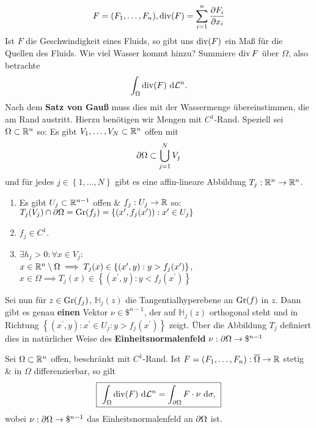 \[
	F = (F_1, \dotsc, F_n), \operatorname{div} (F) = \sum_{i=1}^{n} \frac{ \partial F_i }{ \partial x_i } 
\]
Ist $ F $ die Geschwindigkeit eines Fluids, so gibt uns $ \operatorname{div}(F) $ ein Maß für die Quellen des Fluids.
Wie viel Wasser kommt hinzu?
Summiere $ \operatorname{div} F $ über $ \Omega $, also betrachte 
\[
	\int_{\Omega}^{} \operatorname{div}(F) ~\text{d} \mathcal{L} ^n.
\]
Nach dem \textbf{Satz von Gauß} muss dies mit der Wassermenge übereinstimmen, die am Rand austritt.
Hierzu benötigen wir Mengen mit $ C^1 $-Rand.
Speziell sei $ \Omega \subset \mathbb{R} ^n $ so:
Es gibt $ V_1, \dotsc, V_N \subset \mathbb{R} ^n $ offen mit
\[
	\partial \Omega \subset \bigcup_{j = 1} ^{N} V_j
\]
und für jedes $ j \in \left\{ 1, \dotsc, N \right\}  $ gibt es eine affin-lineare Abbildung $ T_j : \mathbb{R} ^n \to \mathbb{R} ^n $.
\begin{enumerate}[label=(\roman*)]
	\item Es gibt $ U_j \subset  \mathbb{R} ^{n - 1}  $ offen \& $ f_j : U_j \to \mathbb{R}  $ so: $ T_j(V_j) \cap \partial \Omega = \operatorname{Gr}(f_j) = \left\{ \left( x^\prime , f_j(x^\prime ) \right) : x^\prime \in U_j \right\}  $ 
	\item $ f_j \in C^1 $.
	\item $ \exists h_j > 0 : \forall x \in V_j :$\\
		$ x \in \mathbb{R} ^n \setminus \Omega \implies T_j (x) \in \left\{ (x^\prime , y) : y > f_j(x^\prime ) \right\}  $,\\
		$ x \in \Omega \implies T_j(x) \in \left\{ (x^\prime , y) : y < f_j (x^\prime ) \right\}  $
\end{enumerate}
Sei nun für $ z \in \operatorname{Gr}(f_j) $, $ \mathbb{H}_{j} (z) $ die Tangentialhyperebene an $ \operatorname{Gr}(f) $ in $ z $.
Dann gibt es genau \textbf{einen} Vektor $ \nu \in \mathdollar^{n - 1}  $, der auf $ \mathbb{H}_j(z) $ orthogonal steht und in Richtung $ \left\{ (x^\prime , y) : x^\prime \in U_j : y > f_j(x^\prime ) \right\}  $ zeigt.
Über die Abbildung $ T_j $ definiert dies in natürlicher Weise des \textbf{Einheitsnormalenfeld} $ \nu : \partial \Omega \to \mathdollar^{n - 1}  $

\begin{subtheorem}[Gauß, Divergenzsatz ($ \hat{=} $ Quellenbilanz)]
	Sei $ \Omega \subset \mathbb{R} ^n $ offen, beschränkt mit $ C^1 $-Rand.
	Ist $ F = (F_1, \dotsc, F_n) : \overline{\Omega} \to \mathbb{R}  $ stetig \& in $ \Omega $ differenzierbar, so gilt
	\[
		\text{\fbox{
			$\int _\Omega \operatorname{div}(F) ~\text{d} \mathcal{L} ^n = \int _{\partial \Omega} F \cdot \nu ~\text{d} \sigma,$
		}}
	\]
	wobei $ \nu : \partial \Omega \to \mathdollar ^{n - 1}  $ das Einheitsnormalenfeld an $ \partial \Omega $ ist.
\end{subtheorem}


